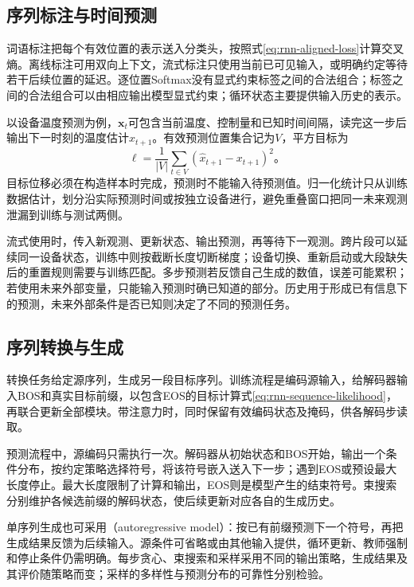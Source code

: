 \subsection{序列标注与时间预测}
\label{sec:rnn-application-aligned}

词语标注把每个有效位置的表示送入分类头，按照式\eqref{eq:rnn-aligned-loss}计算交叉熵。离线标注可用双向上下文，流式标注只使用当前已可见输入，或明确约定等待若干后续位置的延迟。逐位置Softmax没有显式约束标签之间的合法组合；标签之间的合法组合可以由相应输出模型显式约束；循环状态主要提供输入历史的表示。

以设备温度预测为例，$\bm{x}_t$可包含当前温度、控制量和已知时间间隔，读完这一步后输出下一时刻的温度估计$\widehat x_{t+1}$。有效预测位置集合记为$V$，平方目标为
\begin{equation}
  \ell=\frac{1}{|V|}\sum_{t\in V}
      (\widehat x_{t+1}-x_{t+1})^2\text{。}
  \label{eq:rnn-forecast-loss}
\end{equation}
目标位移必须在构造样本时完成，预测时不能输入待预测值。归一化统计只从训练数据估计，划分沿实际预测时间或按独立设备进行，避免重叠窗口把同一未来观测泄漏到训练与测试两侧。

流式使用时，传入新观测、更新状态、输出预测，再等待下一观测。跨片段可以延续同一设备状态，训练中则按截断长度切断梯度；设备切换、重新启动或大段缺失后的重置规则需要与训练匹配。多步预测若反馈自己生成的数值，误差可能累积；若使用未来外部变量，只能输入预测时确已知道的部分。历史用于形成已有信息下的预测，未来外部条件是否已知则决定了不同的预测任务。

\subsection{序列转换与生成}
\label{sec:rnn-application-generation}

转换任务给定源序列，生成另一段目标序列。训练流程是编码源输入，给解码器输入BOS和真实目标前缀，以包含EOS的目标计算式\eqref{eq:rnn-sequence-likelihood}，再联合更新全部模块。带注意力时，同时保留有效编码状态及掩码，供各解码步读取。

预测流程中，源编码只需执行一次。解码器从初始状态和BOS开始，输出一个条件分布，按约定策略选择符号，将该符号嵌入送入下一步；遇到EOS或预设最大长度停止。最大长度限制了计算和输出，EOS则是模型产生的结束符号。束搜索分别维护各候选前缀的解码状态，使后续更新对应各自的生成历史。

单序列生成也可采用（autoregressive model）：按已有前缀预测下一个符号，再把生成结果反馈为后续输入。源条件可省略或由其他输入提供，循环更新、教师强制和停止条件仍需明确。每步贪心、束搜索和采样采用不同的输出策略，生成结果及其评价随策略而变；采样的多样性与预测分布的可靠性分别检验。

